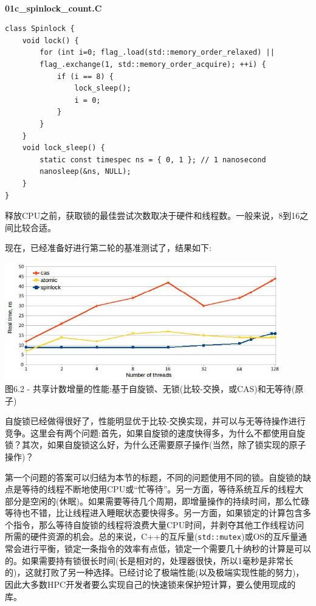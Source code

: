 \hspace*{\fill} \\ %
\noindent
\textbf{01c\_spinlock\_count.C}
\begin{lstlisting}[style=styleCXX]
class Spinlock {
	void lock() {
		for (int i=0; flag_.load(std::memory_order_relaxed) ||
		flag_.exchange(1, std::memory_order_acquire); ++i) {
			if (i == 8) {
				lock_sleep();
				i = 0;
			}
		}
	}
	void lock_sleep() {
		static const timespec ns = { 0, 1 }; // 1 nanosecond
		nanosleep(&ns, NULL);
	}
}
\end{lstlisting}

释放CPU之前，获取锁的最佳尝试次数取决于硬件和线程数。一般来说，8到16之间比较合适。

现在，已经准备好进行第二轮的基准测试了，结果如下:

\begin{center}
\includegraphics[width=0.9\textwidth]{content/2/chapter6/images/2.jpg}\\
图6.2 - 共享计数增量的性能:基于自旋锁、无锁(比较-交换，或CAS)和无等待(原子)
\end{center}

自旋锁已经做得很好了，性能明显优于比较-交换实现，并可以与无等待操作进行竞争。这里会有两个问题:首先，如果自旋锁的速度快得多，为什么不都使用自旋锁？其次，如果自旋锁这么好，为什么还需要原子操作(当然，除了锁实现的原子操作)？

第一个问题的答案可以归结为本节的标题，不同的问题使用不同的锁。自旋锁的缺点是等待的线程不断地使用CPU或“忙等待”。另一方面，等待系统互斥的线程大部分是空闲的(休眠)。如果需要等待几个周期，即增量操作的持续时间，那么忙碌等待也不错，比让线程进入睡眠状态要快得多。另一方面，如果锁定的计算包含多个指令，那么等待自旋锁的线程将浪费大量CPU时间，并剥夺其他工作线程访问所需的硬件资源的机会。总的来说，C++的互斥量(\texttt{std::mutex})或OS的互斥量通常会进行平衡，锁定一条指令的效率有点低，锁定一个需要几十纳秒的计算是可以的。如果需要持有锁很长时间(长是相对的，处理器很快，所以1毫秒是非常长的)，这就打败了另一种选择。已经讨论了极端性能(以及极端实现性能的努力)，因此大多数HPC开发者要么实现自己的快速锁来保护短计算，要么使用现成的库。

